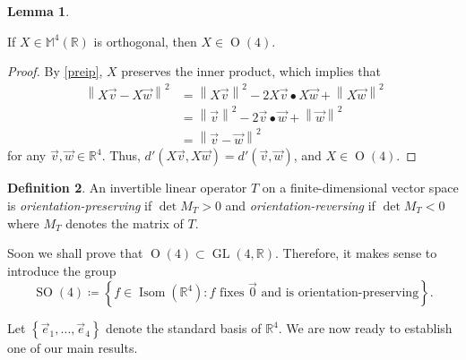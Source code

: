 \documentclass[10pt,letterpaper,cm]{nupset}
\theoremstyle{definition}
\newtheorem{definition}{Definition}[section]
\theoremstyle{theorem}
\newtheorem{lemma}[definition]{Lemma}
\theoremstyle{remark}
\newcommand{\M}{\mathbb M}
\newcommand{\R}{\mathbb R}
\newcommand{\1}{\mathbf{1}}
\newcommand{\e}{\vec e}
\renewcommand{\v}{\vec v}
\newcommand{\w}{\vec w}
\newcommand{\0}{\vec {0}}
\DeclareMathOperator{\ORT}{O}
\DeclareMathOperator{\Isom}{Isom}
\DeclareMathOperator{\SO}{SO}
\DeclareMathOperator{\GL}{GL}
\begin{document}
\begin{lemma}\label{l2}

If $X\in \M^4(\R)$ is orthogonal, then $X\in \ORT(4)$.
\end{lemma}

\begin{proof}
 By \cref{preip}, $X$ preserves the inner product, which implies that 
 \begin{align*}
 \ \left\lVert{X\v -X\w}\right\rVert^2&= \left\lVert{X\v}\right\rVert^2-2X\v\bullet X\w+ \left\lVert{X\w}\right\rVert^2
 \\ & =  \left\lVert{\v}\right\rVert^2-2\v\bullet \w+ \left\lVert{\w}\right\rVert^2
 \\ & = \left\lVert{\v-\w}\right\rVert^2
 \end{align*} for any $\v, \w\in \R^4$. Thus, $d'(X\v, X\w)=d'(\v, \w)$, and $X\in \ORT(4)$. 

\end{proof}

\begin{definition}
An invertible linear operator $T$ on a finite-dimensional vector space is \textit{orientation-preserving} if $\det{M_T}>0$ and \textit{orientation-reversing} if $\det{M_T}<0$ where $M_T$ denotes the matrix of $T$.
\end{definition}

Soon we shall prove that $\ORT(4)\subset \GL(4,\R)$. Therefore, it makes sense to introduce the group $$\SO(4)\coloneqq \left\{f\in  \Isom(\R^4): f \text{ fixes } \0 \text{ and is orientation-preserving}\right\}.$$

Let $\left\{\e_1, \ldots, \e_4\right\}$  denote the standard basis of $\R^4$. We are now ready to establish one of our main results.
\end{document}
